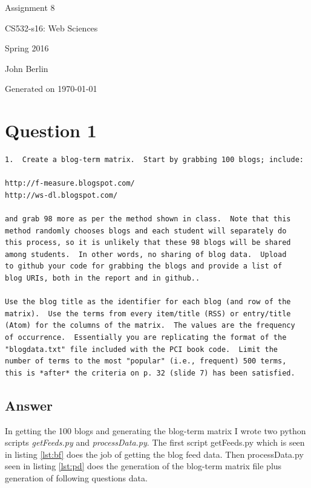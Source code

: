 \documentclass[letterpaper,10pt]{article}
\begin{document}
 

\begin{titlepage}

\begin{center}

\Huge{Assignment 8}

\Large{CS532-s16:  Web Sciences}

\Large{Spring 2016}

\Large{John Berlin}

\Large Generated on \today

\end{center}

\end{titlepage}
\newpage
\printindex
\newpage
\section*{Question 1}
\begin{verbatim}
1.  Create a blog-term matrix.  Start by grabbing 100 blogs; include:

http://f-measure.blogspot.com/
http://ws-dl.blogspot.com/

and grab 98 more as per the method shown in class.  Note that this
method randomly chooses blogs and each student will separately do
this process, so it is unlikely that these 98 blogs will be shared
among students.  In other words, no sharing of blog data.  Upload
to github your code for grabbing the blogs and provide a list of
blog URIs, both in the report and in github..

Use the blog title as the identifier for each blog (and row of the
matrix).  Use the terms from every item/title (RSS) or entry/title
(Atom) for the columns of the matrix.  The values are the frequency
of occurrence.  Essentially you are replicating the format of the
"blogdata.txt" file included with the PCI book code.  Limit the
number of terms to the most "popular" (i.e., frequent) 500 terms,
this is *after* the criteria on p. 32 (slide 7) has been satisfied.
\end{verbatim}
\subsection*{Answer}
In getting the 100 blogs and generating the blog-term matrix I wrote two python scripts
\emph{getFeeds.py} and \emph{processData.py}. The first script getFeeds.py which is seen in listing \hyperref[lst:bf]{\ref{lst:bf}} does the job of getting the blog feed data. Then processData.py seen in listing \hyperref[lst:pd]{\ref{lst:pd}} does the generation of the blog-term matrix file plus generation of following questions data.
\end{document}
